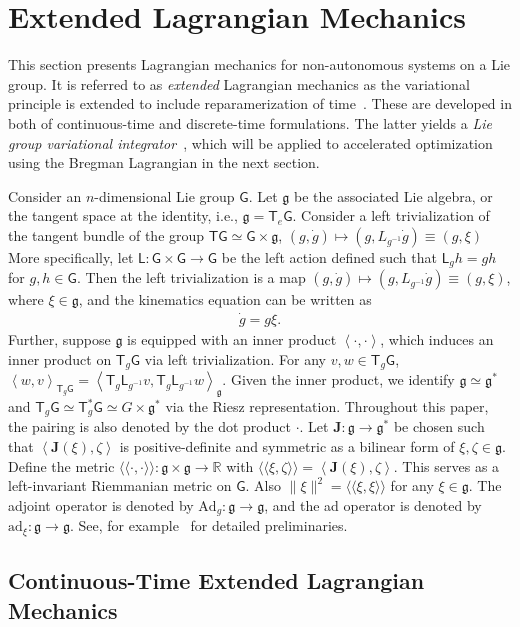 \documentclass[letterpaper, 10pt, conference]{ieeeconf}
\newcommand{\G}{\ensuremath{\mathsf{G}}}
\newcommand{\T}{\ensuremath{\mathsf{T}}}
\renewcommand{\L}{\ensuremath{\mathsf{L}}}
\renewcommand{\Re}{\ensuremath{\mathbb{R}}}
\newcommand{\pair}[1]{\ensuremath{\left\langle #1 \right\rangle}}
\newcommand{\met}[1]{\ensuremath{\langle\!\langle #1 \rangle\!\rangle}}
\newcommand{\Ad}{\ensuremath{\mathrm{Ad}}}
\newcommand{\ad}{\ensuremath{\mathrm{ad}}}
\newcommand{\g}{\ensuremath{\mathfrak{g}}}
\begin{document}
\section{Extended Lagrangian Mechanics}

This section presents Lagrangian mechanics for non-autonomous systems on a Lie group. 
It is referred to as \textit{extended} Lagrangian mechanics as the variational principle is extended to include reparamerization of time~\cite{MarWesAN01}.
These are developed in both of continuous-time and discrete-time formulations. The latter yields a \textit{Lie group variational integrator}~\cite{LeeLeoCMAME07}, which will be applied to accelerated optimization using the Bregman Lagrangian in the next section.

Consider  an $n$-dimensional Lie group $\G$.
Let $\g$ be the associated Lie algebra, or the tangent space at the identity, i.e., $\g = \T_e\G$.
Consider a left trivialization of the tangent bundle of the group $\T\G \simeq \G\times \g$, $(g,\dot g)\mapsto (g, L_{g^{-1}}\dot g)\equiv(g,\xi)$
More specifically, let $\L:\G\times\G\rightarrow\G$ be the left action defined such that $\L_g h = gh$ for $g,h\in\G$.
Then the left trivialization is a map $(g,\dot g)\mapsto (g, L_{g^{-1}}\dot g)\equiv(g,\xi)$, where $\xi\in\g$, and the kinematics equation can be written as
\begin{align}
    \dot g = g\xi. \label{eqn:g_dot}
\end{align}
Further, suppose $\g$ is equipped with an inner product $\pair{\cdot, \cdot}$, which induces an inner product on $\T_g\G$ via left trivialization.
For any $v,w\in\T_g\G$, $\pair{w,v}_{\T_g\G} = \pair{ \T_g \L_{g^{-1}} v, \T_g \L_{g^{-1}} w}_\g$. 
Given the inner product, we identify $\g\simeq \g^*$ and $\T_g \G \simeq \T^*_g \G\simeq G\times \g^*$ via the Riesz representation. Throughout this paper, the pairing is also denoted by the dot product $\cdot$.
Let $\mathbf{J}:\g\rightarrow\g^*$ be chosen such that $\pair{\mathbf{J}(\xi),\zeta}$ is positive-definite and symmetric as a bilinear form of $\xi,\zeta\in\g$.
Define the metric $\met{\cdot,\cdot}:\g\times\g\rightarrow\Re$ with $\met{\xi,\zeta} = \pair{\mathbf{J}(\xi),\zeta}$.
This serves as a left-invariant Riemmanian metric on $\G$.
Also $\|\xi\|^2 = \met{\xi,\xi}$ for any $\xi\in\g$.
The adjoint operator is denoted by $\Ad_g:\g\rightarrow\g$, and the ad operator is denoted by $\ad_\xi:\g\rightarrow\g$. See, for example~\cite{MarRat99} for detailed preliminaries. 

\subsection{Continuous-Time Extended Lagrangian Mechanics}
\end{document}
